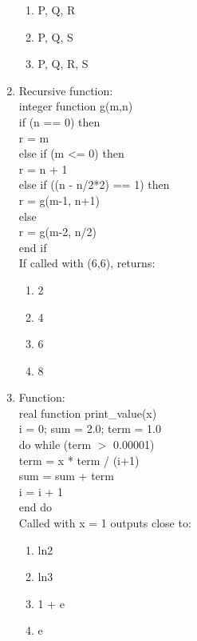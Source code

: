 \documentclass[journal,cmex10]{IEEEtran}
\theoremstyle{remark}
\numberwithin{equation}{enumi}
\numberwithin{figure}{enumi}
\begin{document}
\begin{enumerate}[label=\arabic*)]
\begin{enumerate}[label=\alph*)]
        \item P, Q, R
        \item P, Q, S
        \item P, Q, R, S
    \end{enumerate}
    \bigskip

    \item Recursive function:\\

integer function g(m,n)\\
if (n == 0) then\\
   r = m\\
else if (m <= 0) then\\
   r = n + 1\\
else if ((n - n/2*2) == 1) then\\
   r = g(m-1, n+1)\\
else\\
   r = g(m-2, n/2)\\
end if\\

    If called with (6,6), returns:
    \bigskip
   \hfill {}
    \begin{enumerate}[label=\alph*)]
        \item 2
        \item 4
        \item 6
        \item 8
    \end{enumerate}
    \newpage

    \item Function:\\

real function print\_value(x)\\
i = 0; sum = 2.0; term = 1.0\\
do while (term $>$ 0.00001)\\
   term = x * term / (i+1)\\
   sum = sum + term\\
   i = i + 1\\
end do\\
    Called with x = 1  outputs close to:
    \bigskip
    \hfill {}
    \begin{enumerate}[label=\alph*)]
        \item ln2
        \item ln3
        \item 1 + e
        \item e
    \end{enumerate}
    \bigskip


\end{enumerate}
\end{document}
